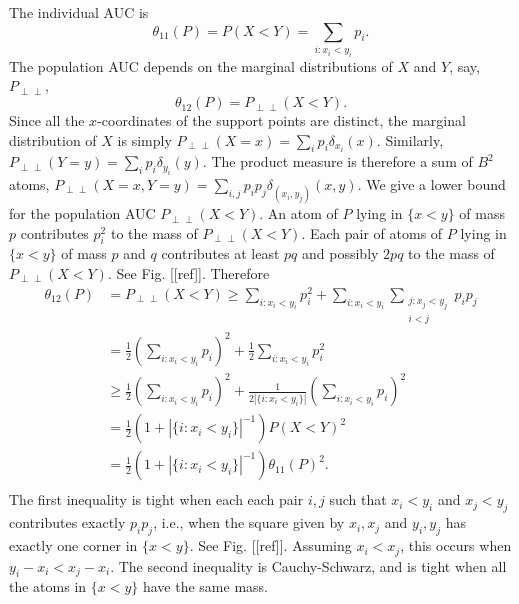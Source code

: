 \message{ !name(manuscript.tex)}\documentclass[12pt]{article}
\DeclareMathOperator{\AUC}{AUC}
\renewcommand{\P}{P}
\newcommand{\cind}{\perp \!\!\! \perp}
\newcommand{\aucindiv}{\theta_{11}}%
\newcommand{\aucpop}{\theta_{12}}%
\newcommand{\Pind}{P_{\cind}}
\begin{document}
The individual AUC is
$$\aucindiv(P)=\P(X<Y)=\underset{i:x_i<y_i}{\sum} p_i.$$
The population AUC depends on the marginal distributions of $X$ and
$Y$, say, $\Pind$,
$$\theta_{12}(\P)=\Pind(X<Y).$$
Since all the $x$-coordinates of the support points are distinct, the
marginal distribution of $X$ is simply
$\Pind(X=x)=\sum_i p_i\delta_{x_i}(x)$. Similarly,
$\Pind(Y=y)=\sum_i p_i\delta_{y_i}(y).$ The product measure is
therefore a sum of $B^2$ atoms,
$\Pind(X=x,Y=y)=\sum_{i,j}p_ip_j\delta_{(x_i,y_j)}(x,y)$. We give a
lower bound for the population AUC $\Pind(X<Y)$. An atom of $\P$ lying
in $\{x<y\}$ of mass $p$ contributes $p_i^2$ to the mass of
$\Pind(X<Y)$. Each pair of atoms of $\P$ lying in $\{x<y\}$ of mass
$p$ and $q$ contributes at least $pq$ and possibly $2pq$ to the mass
of $\Pind(X<Y)$. See Fig. [[ref]].%
Therefore
\begin{align}
  \aucpop(\P)&=\Pind(X<Y) \ge \sum_{i:x_i<y_i} p_i^2 +
           \sum_{i:x_i<y_i}\underset{\substack{j:x_j<y_j\\i<j}}{\sum} p_ip_j\\
         &= \frac{1}{2}\left(\underset{i:x_i<y_i}{\sum} p_i\right)^2 +
           \frac{1}{2}\underset{i:x_i<y_i}{\sum} p_i^2\\
         &\ge \frac{1}{2}\left(\underset{i:x_i<y_i}{\sum} p_i\right)^2 +
           \frac{1}{2|\{i:x_i<y_i\}|}\left(\underset{i:x_i<y_i}{\sum} p_i\right)^2\\
         &= \frac{1}{2}(1+|\{i:x_i<y_i\}|^{-1})\P(X<Y)^2\\
         &= \frac{1}{2}(1+|\{i:x_i<y_i\}|^{-1})\aucindiv(\P)^2.\\
\end{align}
The first inequality is tight when each each pair $i,j$ such that
$x_i<y_i$ and $x_j<y_j$ contributes exactly $p_ip_j$, i.e., when the
square given by $x_i,x_j$ and $y_i,y_j$ has exactly one corner in
$\{x<y\}$. See Fig. [[ref]]. Assuming $x_i<x_j$, this occurs when
$y_i-x_i < x_j-x_i$.  The second inequality is Cauchy-Schwarz, and is
tight when all the atoms in $\{x<y\}$ have the same mass.
\end{document}
